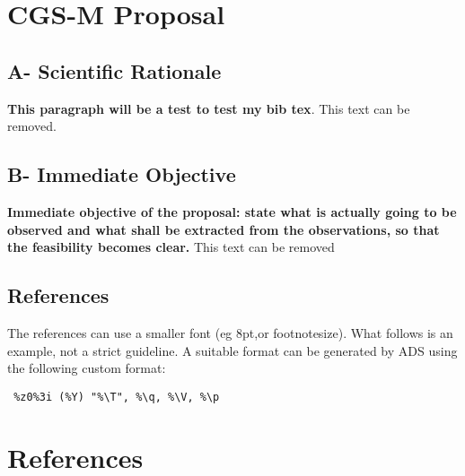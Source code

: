 \documentclass{article}
\begin{document}
\section{CGS-M Proposal}
\subsection{A- Scientific Rationale}

{\bf This paragraph will be a test to test my bib tex}. This text can be removed.

\subsection{B- Immediate Objective}
{\bf Immediate objective of the proposal: state what is actually going to be observed and what shall be extracted from the observations, so that the feasibility becomes clear.} This text can be removed \citep{trugman_tree_2018}

\subsection{References}

The references can use a smaller font (eg 8pt,or footnotesize). What follows is an example, not a strict guideline. A suitable format can be generated by ADS using the following custom format: 
\begin{verbatim} %z0%3i (%Y) "%\T", %\q, %\V, %\p 
\end{verbatim}

\section{References}


\end{document}

